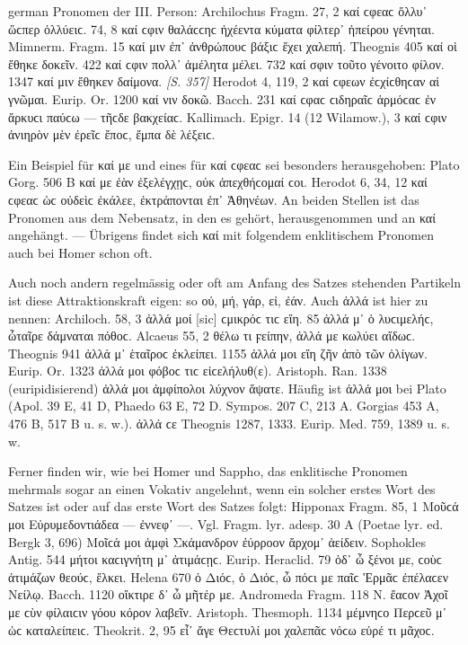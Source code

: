 \begin{otherlanguage*}{german}
Pronomen der III. Person: Archilochus Fragm. 27, 2 καί ϲφεαϲ ὄλλυ᾽ ὥϲπερ ὀλλύειϲ. 74, 8 καί ϲφιν θαλάϲϲηϲ ἠχέεντα κύματα φίλτερ᾽ ἠπείρου γένηται. Mimnerm. Fragm. 15 καί μιν ἐπ᾽ ἀνθρώπουϲ βάξιϲ ἔχει χαλεπή. Theognis 405 καί οἱ ἔθηκε δοκεῖν. 422 καί ϲφιν πολλ᾽ ἀμέλητα μέλει. 732 καί σφιν τοῦτο γένοιτο φίλον. 1347 καί μιν ἔθηκεν δαίμονα. \hypertarget{p357}{\emph{[S. 357]}}\label{p357} Herodot 4, 119, 2 καί ϲφεων ἐϲ\-χίϲ\-θη\-ϲαν αἱ γνῶμαι. Eurip. Or. 1200 καί νιν δοκῶ. Bacch. 231 καί ϲφαϲ ϲιδηραῖϲ ἁρμόϲαϲ ἐν ἄρκυϲι παύϲω — τῆϲδε βακχείαϲ. Kallimach. Epigr. 14 (12 Wilamow.), 3 καί ϲφιν ἀνιηρὸν μὲν ἐρεῖϲ ἔποϲ, ἔμπα δὲ λέξειϲ.

Ein Beispiel für καί με und eines für καί ϲφεαϲ sei besonders herausgehoben: Plato Gorg. 506 B καί με ἐὰν ἐξελέγχῃϲ, οὐκ ἀπεχθήϲομαί ϲοι. Herodot 6, 34, 12 καί ϲφεαϲ ὡϲ οὐδεὶϲ ἐκάλεε, ἐκτράπονται ἐπ᾽ Ἀθηνέων. An beiden Stellen ist das Pronomen aus dem Nebensatz, in den es gehört, herausgenommen und an καί angehängt. — Übrigens findet sich καί mit folgendem enklitischem Pronomen auch bei Homer schon oft.

Auch noch andern regelmässig oder oft am Anfang des Satzes stehenden Partikeln ist diese Attraktionskraft eigen: so οὐ, μή, γάρ, εἰ, ἐάν. Auch ἀλλά ist hier zu nennen: Archiloch. 58, 3 ἀλλά μοί [sic] ϲμικρόϲ τιϲ εἴη. 85 ἀλλά μ᾽ ὁ λυϲιμελήϲ, ὦταῖρε δάμναται πόθοϲ. Alcaeus 55, 2 θέλω τι ϝείπην, ἀλλά με κωλύει αἴδωϲ. Theognis 941 ἀλλά μ᾽ ἑταῖροϲ ἐκλείπει. 1155 ἀλλά μοι εἴη ζῆν ἀπὸ τῶν ὀλίγων. Eurip. Or. 1323 ἀλλά μοι φόβοϲ τιϲ εἰϲελήλυθ(ε). Aristoph. Ran. 1338 (euripidisierend) ἀλλά μοι ἀμφίπολοι λύχνον ἅψατε. Häufig ist ἀλλά μοι bei Plato (Apol. 39 Ε, 41 D, Phaedo 63 E, 72 D. Sympos. 207 C, 213 A. Gorgias 453 A, 476 B, 517 B u. s. w.). ἀλλά ϲε Theognis 1287, 1333. Eurip. Med. 759, 1389 u. s. w.

Ferner finden wir, wie bei Homer und Sappho, das enklitische Pronomen mehrmals sogar an einen Vokativ angelehnt, wenn ein solcher erstes Wort des Satzes ist oder auf das erste Wort des Satzes folgt: Hipponax Fragm. 85, 1 Μοῦϲά μοι Εὐρυμεδοντιάδεα — ἐννεφ᾽ —. Vgl. Fragm. lyr. adesp. 30 A (Poetae lyr. ed. Bergk 3, 696) Μοῖϲά μοι ἀμφὶ Σκάμανδρον ἐύρροον ἄρχομ᾽ ἀείδειν. Sophokles Antig. 544 μήτοι καϲιγνήτη μ᾽ ἀτιμάϲῃϲ. Eurip. Heraclid. 79 ὁδ᾽ ὦ ξένοι με, ϲοὺϲ ἀτιμάζων θεούϲ, ἕλκει. Helena 670 ὁ Διόϲ, ὁ Διόϲ, ὦ πόϲι με παῖϲ Ἑρμᾶϲ ἐπέλαϲεν Νείλῳ. Bacch. 1120 οἴκτιρε δ᾽ ὦ μῆτέρ με. Andromeda Fragm. 118 Ν. ἔαϲον Ἀχοῖ με ϲὺν φίλαιϲιν γόου κόρον λαβεῖν. Aristoph. Thesmoph. 1134 μέμνηϲο Περϲεῦ μ᾽ ὡϲ καταλείπειϲ. Theokrit. 2, 95 εἶ᾽ ἄγε Θεϲτυλί μοι χαλεπᾶϲ νόϲω εὑρέ τι μᾶχοϲ.


\end{otherlanguage*}
